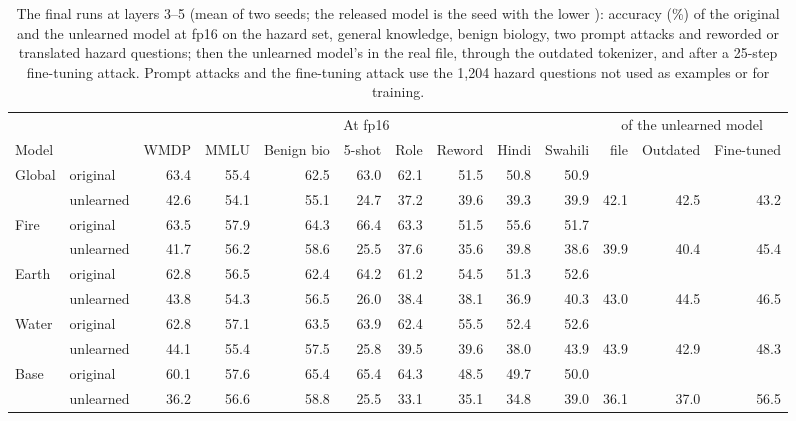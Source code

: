 \begin{table}[t]
\centering\footnotesize\setlength{\tabcolsep}{2.45pt}
\begin{tabular}{@{}llrrrrrrrrrrr@{}}
\toprule
 & & \multicolumn{8}{c}{At fp16} & \multicolumn{3}{c}{\wmdp{} of the unlearned model} \\
\cmidrule(lr){3-10}\cmidrule(l){11-13}
Model & & WMDP & MMLU & Benign bio & 5-shot & Role & Reword & Hindi & Swahili & \qkm{} file & Outdated & Fine-tuned \\
\midrule
Global & original & 63.4 & 55.4 & 62.5 & 63.0 & 62.1 & 51.5 & 50.8 & 50.9 & & & \\
 & unlearned & 42.6 & 54.1 & 55.1 & 24.7 & 37.2 & 39.6 & 39.3 & 39.9 & 42.1 & 42.5 & 43.2 \\
\addlinespace[2pt]
Fire & original & 63.5 & 57.9 & 64.3 & 66.4 & 63.3 & 51.5 & 55.6 & 51.7 & & & \\
 & unlearned & 41.7 & 56.2 & 58.6 & 25.5 & 37.6 & 35.6 & 39.8 & 38.6 & 39.9 & 40.4 & 45.4 \\
\addlinespace[2pt]
Earth & original & 62.8 & 56.5 & 62.4 & 64.2 & 61.2 & 54.5 & 51.3 & 52.6 & & & \\
 & unlearned & 43.8 & 54.3 & 56.5 & 26.0 & 38.4 & 38.1 & 36.9 & 40.3 & 43.0 & 44.5 & 46.5 \\
\addlinespace[2pt]
Water & original & 62.8 & 57.1 & 63.5 & 63.9 & 62.4 & 55.5 & 52.4 & 52.6 & & & \\
 & unlearned & 44.1 & 55.4 & 57.5 & 25.8 & 39.5 & 39.6 & 38.0 & 43.9 & 43.9 & 42.9 & 48.3 \\
\addlinespace[2pt]
Base & original & 60.1 & 57.6 & 65.4 & 65.4 & 64.3 & 48.5 & 49.7 & 50.0 & & & \\
 & unlearned & 36.2 & 56.6 & 58.8 & 25.5 & 33.1 & 35.1 & 34.8 & 39.0 & 36.1 & 37.0 & 56.5 \\
\bottomrule
\end{tabular}
\caption{The final runs at layers 3--5 (mean of two seeds; the released model is the seed with the lower \wmdp{}): accuracy (\%) of the original and the unlearned model at fp16 on the hazard set, general knowledge, benign biology, two prompt attacks and reworded or translated hazard questions; then the unlearned model's \wmdp{} in the real \qkm{} file, through the outdated tokenizer, and after a 25-step fine-tuning attack. Prompt attacks and the fine-tuning attack use the 1,204 hazard questions not used as examples or for training.}
\label{tab:check}
\end{table}

